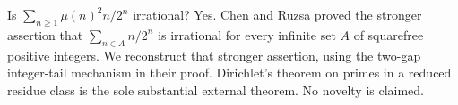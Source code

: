 Is $\sum_{n\ge1}\mu(n)^2n/2^n$ irrational? Yes. Chen and Ruzsa proved the stronger assertion that $\sum_{n\in A}n/2^n$ is irrational for every infinite set $A$ of squarefree positive integers. We reconstruct that stronger assertion, using the two-gap integer-tail mechanism in their proof. Dirichlet's theorem on primes in a reduced residue class is the sole substantial external theorem. No novelty is claimed.
